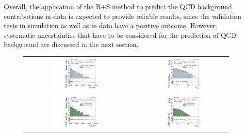 Overall, the application of the R+S method to predict the QCD background contributions in data is expected to provide reliable results, since the validation tests in simulation as well as in data have a positive outcome. However, systematic uncertainties that have to be considered for the prediction of QCD background are discussed in the next section. 
\begin{figure}[!t]
  \centering
  \begin{tabular}{cc}
                \includegraphics[width=0.49\textwidth]{figures/HT_presel_HThigh_data_DR53X_chs_HThigh_invertedDeltaPhi_v1.pdf} &
                \includegraphics[width=0.49\textwidth]{figures/NJets_presel_HThigh_data_DR53X_chs_HThigh_invertedDeltaPhi_v1.pdf} \\
                \includegraphics[width=0.49\textwidth]{figures/HTRA2_MC.pdf} &
                \includegraphics[width=0.49\textwidth]{figures/NJetsRA2_MC.pdf}

\end{tabular}
\end{figure}
